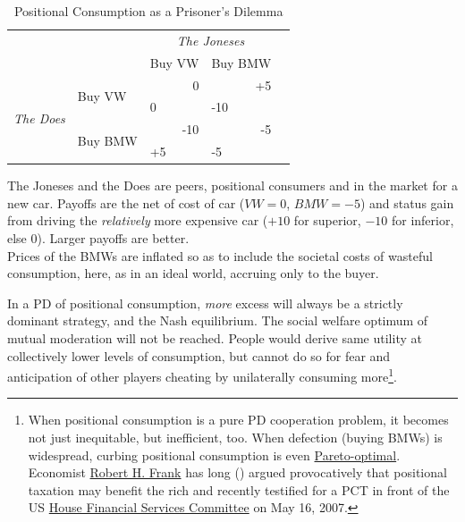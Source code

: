 \begin{table}
	\caption{Positional Consumption as a Prisoner's Dilemma}
	\label{tab:Positional_PD}
	\begin{center}
	\begin{tabular}{m{1cm}m{}m{}m{}m{}}
		& & \multicolumn{2}{c}{\emph{The Joneses}} \\
		& &Buy VW & Buy BMW\\ 
		\cline{3-4}
		\multicolumn{1}{c}{\multirow{4}{*}{\emph{The Does}}} & \multirow{2}{2,3cm}{Buy VW} & 		\multicolumn{1}{|r|}{0} & \multicolumn{1}{r|}{+5}\\ 
		\multicolumn{1}{c}{} & \multicolumn{1}{c}{}& \multicolumn{1}{|l|}{0} & \multicolumn{1}{l|}{-10}\\ 
		\cline{3-4}
		\multicolumn{1}{c}{} & \multirow{2}{2,3cm}{Buy BMW} & \multicolumn{1}{|r|}{-10} & \multicolumn{1}{r|}{-5}\\ 
		\multicolumn{1}{c}{} & \multicolumn{1}{c}{}& \multicolumn{1}{|l|}{+5} & \multicolumn{1}{l|}{-5}\\ 
		\cline{3-4}
	\end{tabular}
	\end{center}
	\scriptsize{The Joneses and the Does are peers, positional consumers and in the market for a new car. Payoffs are the net of cost of car ($VW=0$, $BMW=-5$) and status gain from driving the \emph{relatively} more expensive car ($+10$ for superior, $-10$ for inferior, else $0$). Larger payoffs are better.\\
	Prices of the BMWs are inflated so as to include the societal costs of wasteful consumption, here, as in an ideal world, accruing only to the buyer.}
\end{table}

In a \gls{PD} of positional consumption, \emph{more} excess will always be a strictly dominant strategy, and the Nash equilibrium. The social welfare optimum of mutual moderation will not be reached. People would derive same utility at collectively lower levels of consumption, but cannot do so for fear and anticipation of other players cheating by unilaterally consuming more\footnote{
	When positional consumption is a pure \gls{PD} cooperation problem, it becomes not just inequitable, but inefficient, too. When defection (buying BMWs) is widespread, curbing positional consumption is even \hyperref[sec:Pareto]{Pareto-optimal}. Economist \hyperref[http://www.robert-h-frank.com]{Robert H. Frank} has long (\citeyear{Frank1987}) argued provocatively that positional taxation may benefit the rich and recently testified for a \gls{PCT} in front of the US \hyperref[http://financialservices.house.gov/]{House Financial Services Committee} on May 16, 2007.}.

